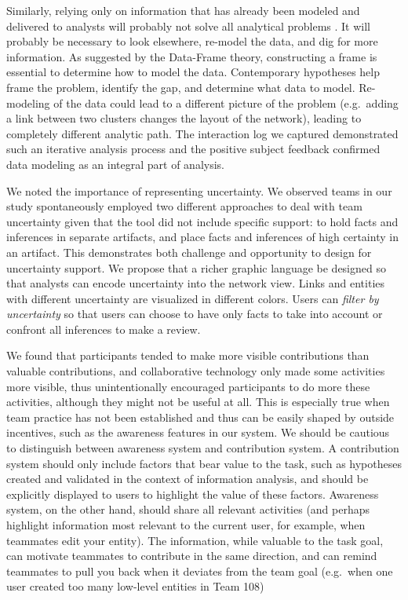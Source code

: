 Similarly, relying only on information that has already been modeled and
delivered to analysts will probably not solve all analytical problems
\autocite{Heuer1999}. It will probably be necessary to look elsewhere,
re-model the data, and dig for more information. As suggested by the
Data-Frame theory, constructing a frame is essential to determine how to
model the data. Contemporary hypotheses help frame the problem, identify
the gap, and determine what data to model. Re-modeling of the data could
lead to a different picture of the problem (e.g.~adding a link between
two clusters changes the layout of the network), leading to completely
different analytic path. The interaction log we captured demonstrated
such an iterative analysis process and the positive subject feedback
confirmed data modeling as an integral part of analysis.

We noted the importance of representing uncertainty. We observed teams
in our study spontaneously employed two different approaches to deal
with team uncertainty given that the tool did not include specific
support: to hold facts and inferences in separate artifacts, and place
facts and inferences of high certainty in an artifact. This demonstrates
both challenge and opportunity to design for uncertainty support. We
propose that a richer graphic language be designed so that analysts can
encode uncertainty into the network view. Links and entities with
different uncertainty are visualized in different colors. Users can
\emph{filter by uncertainty} so that users can choose to have only facts
to take into account or confront all inferences to make a review.

We found that participants tended to make more visible contributions
than valuable contributions, and collaborative technology only made some
activities more visible, thus unintentionally encouraged participants to
do more these activities, although they might not be useful at all. This
is especially true when team practice has not been established and thus
can be easily shaped by outside incentives, such as the awareness
features in our system. We should be cautious to distinguish between
awareness system and contribution system. A contribution system should
only include factors that bear value to the task, such as hypotheses
created and validated in the context of information analysis, and should
be explicitly displayed to users to highlight the value of these
factors. Awareness system, on the other hand, should share all relevant
activities (and perhaps highlight information most relevant to the
current user, for example, when teammates edit your entity). The
information, while valuable to the task goal, can motivate teammates to
contribute in the same direction, and can remind teammates to pull you
back when it deviates from the team goal (e.g.~when one user created too
many low-level entities in Team 108)

